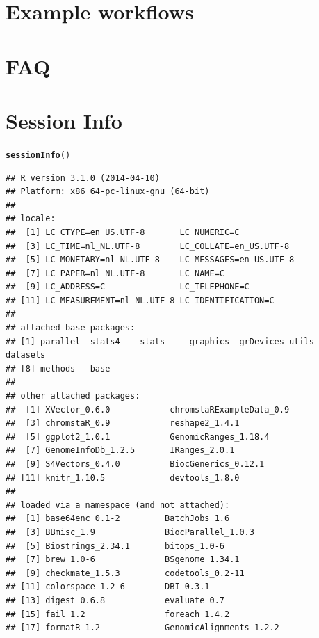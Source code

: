 \documentclass[11pt]{article}\usepackage[]{graphicx}\usepackage[]{color}
\makeatletter
\newcommand{\hlstd}[1]{\textcolor[rgb]{0.345,0.345,0.345}{#1}}%
\newcommand{\hlkwd}[1]{\textcolor[rgb]{0.737,0.353,0.396}{\textbf{#1}}}%
\newenvironment{kframe}{%
 \def\at@end@of@kframe{}%
 \ifinner\ifhmode%
  \def\at@end@of@kframe{\end{minipage}}%
  \begin{minipage}{\columnwidth}%
 \fi\fi%
 \def\FrameCommand##1{\hskip\@totalleftmargin \hskip-\fboxsep
 \colorbox{shadecolor}{##1}\hskip-\fboxsep
     \hskip-\linewidth \hskip-\@totalleftmargin \hskip\columnwidth}%
 \MakeFramed {\advance\hsize-\width
   \@totalleftmargin\z@ \linewidth\hsize
   \@setminipage}}%
 {\par\unskip\endMakeFramed%
 \at@end@of@kframe}
\newenvironment{knitrout}{}{} %
\makeatother
\begin{document}
\section{Example workflows}

\section{\label{sec:faq}FAQ}

\section{Session Info}
\begin{scriptsize}
\begin{knitrout}
\color{fgcolor}\begin{kframe}
\begin{alltt}
\hlkwd{sessionInfo}\hlstd{()}
\end{alltt}
\begin{verbatim}
## R version 3.1.0 (2014-04-10)
## Platform: x86_64-pc-linux-gnu (64-bit)
## 
## locale:
##  [1] LC_CTYPE=en_US.UTF-8       LC_NUMERIC=C              
##  [3] LC_TIME=nl_NL.UTF-8        LC_COLLATE=en_US.UTF-8    
##  [5] LC_MONETARY=nl_NL.UTF-8    LC_MESSAGES=en_US.UTF-8   
##  [7] LC_PAPER=nl_NL.UTF-8       LC_NAME=C                 
##  [9] LC_ADDRESS=C               LC_TELEPHONE=C            
## [11] LC_MEASUREMENT=nl_NL.UTF-8 LC_IDENTIFICATION=C       
## 
## attached base packages:
## [1] parallel  stats4    stats     graphics  grDevices utils     datasets 
## [8] methods   base     
## 
## other attached packages:
##  [1] XVector_0.6.0            chromstaRExampleData_0.9
##  [3] chromstaR_0.9            reshape2_1.4.1          
##  [5] ggplot2_1.0.1            GenomicRanges_1.18.4    
##  [7] GenomeInfoDb_1.2.5       IRanges_2.0.1           
##  [9] S4Vectors_0.4.0          BiocGenerics_0.12.1     
## [11] knitr_1.10.5             devtools_1.8.0          
## 
## loaded via a namespace (and not attached):
##  [1] base64enc_0.1-2         BatchJobs_1.6          
##  [3] BBmisc_1.9              BiocParallel_1.0.3     
##  [5] Biostrings_2.34.1       bitops_1.0-6           
##  [7] brew_1.0-6              BSgenome_1.34.1        
##  [9] checkmate_1.5.3         codetools_0.2-11       
## [11] colorspace_1.2-6        DBI_0.3.1              
## [13] digest_0.6.8            evaluate_0.7           
## [15] fail_1.2                foreach_1.4.2          
## [17] formatR_1.2             GenomicAlignments_1.2.2

\end{verbatim}
\end{kframe}
\end{knitrout}
\end{scriptsize}
\end{document}

